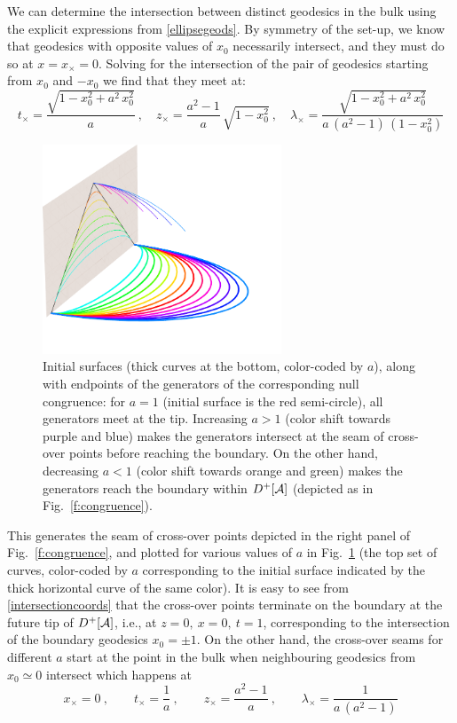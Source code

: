 \documentclass[12pt]{article}
\def\regA{{\cal A}}
\begin{document}
We can determine the intersection between distinct geodesics in the bulk using the explicit expressions from \eqref{ellipsegeods}.  By symmetry of the set-up, we know that geodesics with opposite values of $x_0$ necessarily intersect, and they must do so at $x=x_\times = 0$.  Solving for the intersection of the pair of geodesics starting from $x_0$ and $-x_0$ we find that they meet at:
%
\begin{equation}
t_\times = \frac{ \sqrt{1-x_0^2+a^2 \, x_0^2}}{a} \ , \quad
z_\times = \frac{a^2-1}{a} \,  \sqrt{1-x_0^2} \ , \quad
\lambda_\times = \frac{ \sqrt{1-x_0^2+a^2 \, x_0^2}}{a \, (a^2-1) \, (1-x_0^2)}
\label{intersectioncoords}
\end{equation}	
%
\begin{figure}
\begin{center}
\includegraphics[width=2.8in]{surf_caust_bdy}
\caption{
Initial surfaces (thick curves at the bottom, color-coded by $a$), along with endpoints of the generators of the corresponding null congruence:  for $a=1$ (initial surface is the red semi-circle), all generators meet at the tip.  Increasing $a>1$ (color shift towards purple and blue) makes the generators intersect at the seam of cross-over points before reaching the boundary.  On the other hand, decreasing $a<1$ (color shift towards orange and green) makes the generators reach the boundary within $D^+[\regA]$ (depicted as in Fig.~\ref{f:congruence}).
}
\label{f:initsurfs}
\end{center}
\end{figure}
% 
This generates the seam of cross-over points depicted in the right panel of 
Fig.~\ref{f:congruence}, and plotted for various values of $a$ in Fig.~\ref{f:initsurfs} (the top set of curves, color-coded by $a$ corresponding to the initial surface indicated by the thick horizontal curve of the same color).
It is easy to see from \eqref{intersectioncoords} that the cross-over points terminate on the boundary at the future tip of $D^+[\regA]$, i.e., at $z=0, \ x=0, \ t=1$, corresponding to the intersection of the boundary geodesics $x_0=\pm1$.  On the other hand, the cross-over seams for different $a$ start at the point in the bulk when neighbouring geodesics from $x_0 \simeq 0$ intersect which happens at\
%
\begin{equation}
x_\times = 0 \ , \qquad
t_\times = \frac{1}{a} \ , \qquad
z_\times = \frac{a^2-1}{a} \ , \qquad
\lambda_\times = \frac{1}{a \, (a^2-1)}
\label{causticbottom}
\end{equation}	
%
\end{document}
